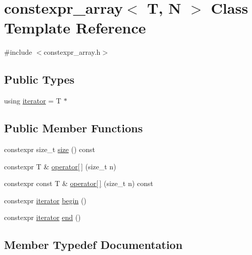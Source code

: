 \hypertarget{classconstexpr__array}{}\section{constexpr\+\_\+array$<$ T, N $>$ Class Template Reference}
\label{classconstexpr__array}


{\ttfamily \#include $<$constexpr\+\_\+array.\+h$>$}

\subsection*{Public Types}
\begin{DoxyCompactItemize}
\item 
using \hyperlink{classconstexpr__array_a649b2a387e5109c7750c536a3518ab3e}{iterator} = T $\ast$
\end{DoxyCompactItemize}
\subsection*{Public Member Functions}
\begin{DoxyCompactItemize}
\item 
constexpr size\+\_\+t \hyperlink{classconstexpr__array_ae6cbbf0ef54c3df192c861572e4a2d5d}{size} () const
\item 
constexpr T \& \hyperlink{classconstexpr__array_a361c0575453f2ae3a363dbd35cd94a8e}{operator\mbox{[}$\,$\mbox{]}} (size\+\_\+t n)
\item 
constexpr const T \& \hyperlink{classconstexpr__array_af4dbc25da16e0e08bedb1d37693eda34}{operator\mbox{[}$\,$\mbox{]}} (size\+\_\+t n) const
\item 
constexpr \hyperlink{classconstexpr__array_a649b2a387e5109c7750c536a3518ab3e}{iterator} \hyperlink{classconstexpr__array_a405f736c800b2cd4527d1b574a56e5af}{begin} ()
\item 
constexpr \hyperlink{classconstexpr__array_a649b2a387e5109c7750c536a3518ab3e}{iterator} \hyperlink{classconstexpr__array_ad3680b32e76738116dbb9c0efeca5bd4}{end} ()
\end{DoxyCompactItemize}


\subsection{Member Typedef Documentation}
\mbox{\label{classconstexpr__array_a649b2a387e5109c7750c536a3518ab3e}} 
